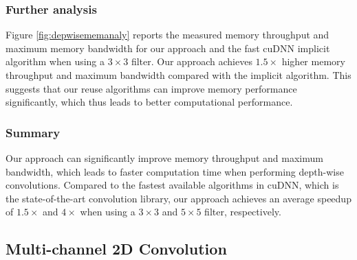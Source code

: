 
\subsubsection{Further analysis}
Figure \ref{fig:depwisememanaly} reports the measured memory throughput and maximum memory bandwidth for our approach and the fast cuDNN implicit algorithm when using a $3 \times 3$ filter. 
Our approach achieves $1.5 \times$ higher memory throughput and maximum bandwidth compared with the implicit algorithm. 
This suggests that our reuse algorithms can improve memory performance significantly, which thus leads to better computational performance.


\subsubsection{Summary}
Our approach can significantly improve memory throughput and maximum bandwidth, which leads to faster computation time when performing
depth-wise convolutions.  Compared to the fastest available algorithms in cuDNN, which is the state-of-the-art convolution library, our
approach achieves an average speedup of $1.5\times$ and $4\times$ when using a $3 \times 3$ and $5 \times 5$ filter, respectively.


\subsection{Multi-channel 2D Convolution}
\label{multicconvexp}

